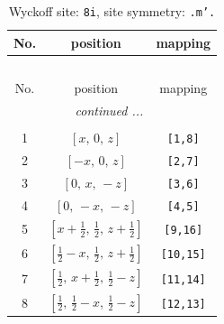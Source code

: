 \documentclass[fleqn,8pt]{jsarticle}
\begin{document}
\begin{longtable}{ccc}
\caption{Wyckoff site: {\tt 8i}, site symmetry: {\tt .m'.}}
 \\
 \hline \hline
No. & position & mapping \\ \hline \endfirsthead

\multicolumn{2}{l}{\tablename\ \thetable{}} \\
 \hline \hline
No. & position & mapping \\ \hline \endhead

 \hline \hline
\multicolumn{2}{r}{\footnotesize\it continued ...} \\ \endfoot

 \hline \hline
\multicolumn{2}{r}{} \\ \endlastfoot

1 & $\left[ x,\, 0,\, z \right]$ & {\tt [1,8]} \\ \hline
2 & $\left[ - x,\, 0,\, z \right]$ & {\tt [2,7]} \\ \hline
3 & $\left[ 0,\, x,\, - z \right]$ & {\tt [3,6]} \\ \hline
4 & $\left[ 0,\, - x,\, - z \right]$ & {\tt [4,5]} \\ \hline
5 & $\left[ x + \frac{1}{2},\, \frac{1}{2},\, z + \frac{1}{2} \right]$ & {\tt [9,16]} \\ \hline
6 & $\left[ \frac{1}{2} - x,\, \frac{1}{2},\, z + \frac{1}{2} \right]$ & {\tt [10,15]} \\ \hline
7 & $\left[ \frac{1}{2},\, x + \frac{1}{2},\, \frac{1}{2} - z \right]$ & {\tt [11,14]} \\ \hline
8 & $\left[ \frac{1}{2},\, \frac{1}{2} - x,\, \frac{1}{2} - z \right]$ & {\tt [12,13]} \\
\end{longtable}
\renewcommand{\arraystretch}{1.2}
\end{document}
